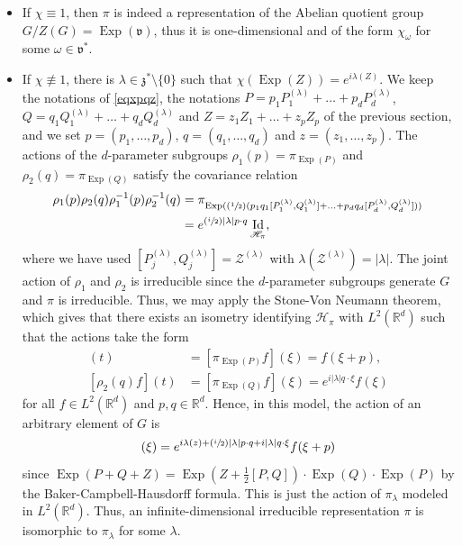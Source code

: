 \documentclass[10pt]{amsart}
\let\mathcal\mathscr
\newcommand{\Psfrac}[2]{(\sfrac{#1}{#2})}
\DeclareMathOperator{\Exp}{Exp}
\DeclareMathOperator{\Id}{Id}
\theoremstyle{plain}
\theoremstyle{definition}
\def\R{{\mathbb R}}
\begin{document}
\begin{itemize}
\item
If $\chi\equiv 1$, then $\pi$ is indeed a representation of the Abelian quotient group $G/Z(G)=\Exp(\mathfrak v)$, thus it is one-dimensional and of the form $\chi_\omega$ for some $\omega\in \mathfrak v^*$.

\item
If $\chi\not\equiv 1$, there is $\lambda\in \mathfrak z^*\setminus \{0\}$ such that $\chi(\Exp(Z))=e^{i\lambda(Z)}$. We keep the notations of \eqref{eqxpqz}, the notations $P=p_1P_1^{(\lambda)}+\ldots+p_dP_d^{(\lambda)}$, $Q=q_1Q_1^{(\lambda)}+\ldots+q_dQ_d^{(\lambda)}$ and $Z=z_1Z_1+\ldots+z_pZ_p$ of the previous section, and we set $p=(p_1,\ldots,p_d)$, $q=(q_1,\ldots,q_d)$ and $z=(z_1,\ldots,z_p)$.
The actions of the $d$-parameter subgroups $\rho_1(p)=\pi_{\Exp(P)}$ and $\rho_2(q)=\pi_{\Exp(Q)}$ satisfy the covariance relation
\begin{align*}
\rho_1(p)\rho_2(q)\rho_1^{-1}(p)\rho_2^{-1}(q)&=\pi_{\Exp(\Psfrac12(p_1q_1[P_1^{(\lambda)},Q_1^{(\lambda)}]+\ldots+p_dq_d[P_d^{(\lambda)},Q_d^{(\lambda)}]))} \\
&=e^{\Psfrac{i}{2}|\lambda|p\cdot q}\Id_{\mathcal{H}_\pi},
\end{align*}
where we have used $[P_j^{(\lambda)},Q_j^{(\lambda)}]= \mathcal Z^{(\lambda)}$ with $\lambda(\mathcal Z^{(\lambda)})=|\lambda|$.
The joint action of $\rho_1$ and $\rho_2$ is irreducible since the $d$-parameter subgroups generate $G$ and $\pi$ is irreducible. Thus, we may apply the Stone-Von Neumann theorem, which gives that there exists an isometry identifying $\mathcal{H}_\pi$ with $L^2(\R^d)$ such that the actions take the form
\begin{align*}
[\rho_1(p)f](t)&=[\pi_{\Exp(P)}f](\xi)=f(\xi+p), \\
[\rho_2(q)f](t)&=[\pi_{\Exp(Q)}f](\xi)=e^{i|\lambda| q\cdot \xi}f(\xi)
\end{align*}
for all $f\in L^2(\R^d)$ and $p,q\in\R^d$.
Hence, in this model, the action of an arbitrary element of $G$ is
\begin{equation*}
[\pi_{\Exp(P+Q+Z)}f](\xi)=e^{i\lambda(z)+\Psfrac{i}{2}|\lambda|p\cdot q+i|\lambda|q\cdot \xi}f(\xi+p)
\end{equation*}
since $\Exp(P+Q+Z)=\Exp(Z+\frac{1}{2}[P,Q])\cdot\Exp(Q)\cdot\Exp(P)$ by the Baker-Campbell-Hausdorff formula. This is just the action of $\pi_\lambda$ modeled in $L^2(\R^d)$. Thus, an infinite-dimensional irreducible representation $\pi$ is isomorphic to $\pi_\lambda$ for some $\lambda$.
\end{itemize}
\end{document}
